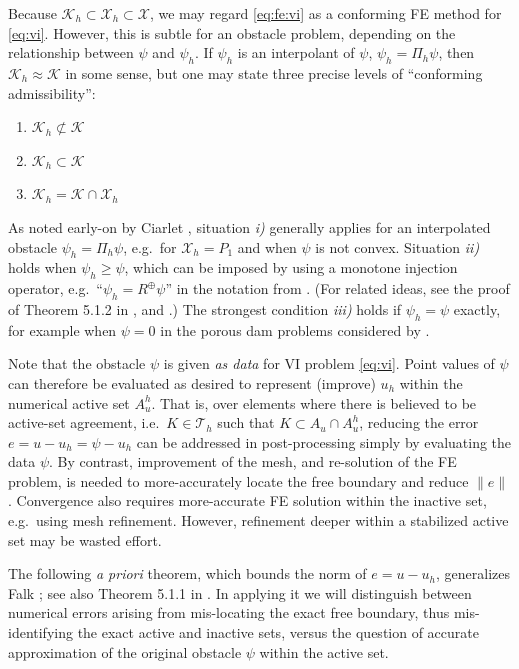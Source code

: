 \documentclass[]{interact}
\theoremstyle{plain}%
\theoremstyle{definition}
\theoremstyle{remark}
\newcommand{\cK}{\mathcal{K}}
\newcommand{\cT}{\mathcal{T}}
\newcommand{\cX}{\mathcal{X}}
\begin{document}
Because $\cK_h \subset \cX_h \subset \cX$, we may regard \eqref{eq:fe:vi} as a conforming FE method for \eqref{eq:vi}.  However, this is subtle for an obstacle problem, depending on the relationship between $\psi$ and $\psi_h$.  If $\psi_h$ is an interpolant of $\psi$, $\psi_h = \Pi_h \psi$, then $\cK_h \approx \cK$ in some sense, but one may state three precise levels of ``conforming admissibility'':
\renewcommand{\labelenumi}{\emph{\roman{enumi})}}
\begin{enumerate}
\item $\cK_h \not \subset \cK$
\item $\cK_h \subset \cK$
\item $\cK_h = \cK \cap \cX_h$
\end{enumerate}
As noted early-on by Ciarlet \cite[Figure 5.1.3]{Ciarlet2002}, situation \emph{i)} generally applies for an interpolated obstacle $\psi_h = \Pi_h \psi$, e.g.~for $\cX_h=P_1$ and when $\psi$ is not convex.  Situation \emph{ii)} holds when $\psi_h \ge \psi$, which can be imposed by using a monotone injection operator, e.g.~``$\psi_h = R^\oplus \psi$'' in the notation from \cite{BuelerFarrell2024}.  (For related ideas, see the proof of Theorem 5.1.2 in \cite{Ciarlet2002}, and \cite{GraeserKornhuber2009}.)  The strongest condition \emph{iii)} holds if $\psi_h=\psi$ exactly, for example when $\psi=0$ in the porous dam problems considered by \cite{AinsworthOdenLee1993}.

Note that the obstacle $\psi$ is given \emph{as data} for VI problem \eqref{eq:vi}.  Point values of $\psi$ can therefore be evaluated as desired to represent (improve) $u_h$ within the numerical active set $A_u^h$.  That is, over elements where there is believed to be active-set agreement, i.e.~$K\in\cT_h$ such that $K \subset A_u \cap A_u^h$, reducing the error $e=u-u_h=\psi-u_h$ can be addressed in post-processing simply by evaluating the data $\psi$.  By contrast, improvement of the mesh, and re-solution of the FE problem, is needed to more-accurately locate the free boundary and reduce $\|e\|$.  Convergence also requires more-accurate FE solution within the inactive set, e.g.~using mesh refinement.  However, refinement deeper within a stabilized active set may be wasted effort.

The following \emph{a priori} theorem, which bounds the norm of $e=u-u_h$, generalizes Falk \cite{Falk1974}; see also Theorem 5.1.1 in \cite{Ciarlet2002}.  In applying it we will distinguish between numerical errors arising from mis-locating the exact free boundary, thus mis-identifying the exact active and inactive sets, versus the question of accurate approximation of the original obstacle $\psi$ within the active set.
\end{document}
